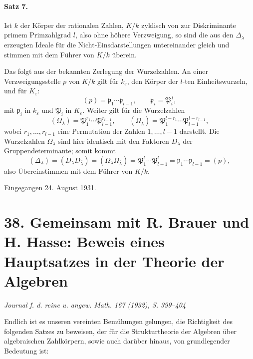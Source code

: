 \documentclass[11pt]{article}
\begin{document}
\paragraph{Satz 7.}
Ist \(k\) der Körper der rationalen Zahlen, \(K/k\) zyklisch von zur Diskriminante primem Primzahlgrad \(l\), also ohne höhere Verzweigung, so sind die aus den \(\Delta_\lambda\) erzeugten Ideale für die Nicht-Einsdarstellungen untereinander gleich und stimmen mit dem Führer von \(K/k\) überein.

Das folgt aus der bekannten Zerlegung der Wurzelzahlen. An einer Verzweigungsstelle \(p\) von \(K/k\) gilt für \(k_\varepsilon\), den Körper der \(l\)-ten Einheitswurzeln, und für \(K_\varepsilon\):
\[
        (p)=\mathfrak p_1\cdots\mathfrak p_{l-1},\qquad
        \mathfrak p_i=\mathfrak P_i^{\,l},
\]
mit \(\mathfrak p_i\) in \(k_\varepsilon\) und \(\mathfrak P_i\) in \(K_\varepsilon\). Weiter gilt für die Wurzelzahlen
\[
        (\Omega_\lambda)=\mathfrak P_1^{r_1}\cdots
        \mathfrak P_{l-1}^{r_{l-1}},
        \qquad
        (\Omega_{\bar\lambda})=
        \mathfrak P_1^{l-r_1}\cdots \mathfrak P_{l-1}^{l-r_{l-1}},
\]
wobei \(r_1,\ldots,r_{l-1}\) eine Permutation der Zahlen \(1,\ldots,l-1\) darstellt. Die Wurzelzahlen \(\Omega_\lambda\) sind hier identisch mit den Faktoren \(D_\lambda\) der Gruppendeterminante; somit kommt
\[
        (\Delta_\lambda)=(D_\lambda D_{\bar\lambda})
        =(\Omega_\lambda\Omega_{\bar\lambda})
        =\mathfrak P_1^l\cdots\mathfrak P_{l-1}^l
        =\mathfrak p_1\cdots\mathfrak p_{l-1}
        =(p),
\]
also Übereinstimmen mit dem Führer von \(K/k\).

\begin{center}
Eingegangen 24. August 1931.
\end{center}

\section*{38. Gemeinsam mit R. Brauer und H. Hasse: Beweis eines Hauptsatzes in der Theorie der Algebren}

\begin{center}
\emph{Journal f. d. reine u. angew. Math. 167 (1932), S. 399--404}
\end{center}

Endlich ist es unseren vereinten Bemühungen gelungen, die Richtigkeit des folgenden Satzes zu beweisen, der für die Strukturtheorie der Algebren über algebraischen Zahlkörpern, sowie auch darüber hinaus, von grundlegender Bedeutung ist:
\end{document}
